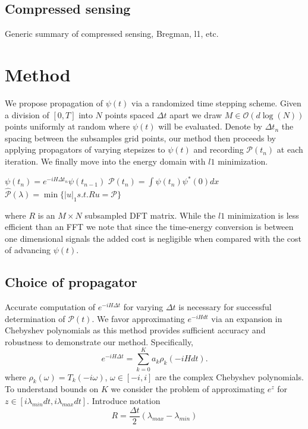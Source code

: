 \documentclass[12pt]{amsart}
\theoremstyle{remark}
\begin{document}
\subsection{Compressed sensing}

Generic summary of compressed sensing, Bregman, l1, etc.

\section{Method}

We propose propagation of $\psi(t)$ via a randomized time stepping scheme. Given a division of $[0,T]$ into $N$ points spaced $\Delta t$ apart we draw $M \in \mathcal{O}(d \log(N))$ points uniformly at random where $\psi(t)$ will be evaluated. Denote by $\Delta t_n$ the spacing between the subsamples grid points, our method then proceeds by applying propagators of varying stepsizes to $\psi(t)$ and recording $\mathcal{P}(t_n)$ at each iteration. We finally move into the energy domain with $l1$ minimization.

\begin{algorithmic}
\STATE $\psi(t_n) = e^{-iH\Delta t_n}\psi(t_{n-1})$
\STATE $\mathcal{P}(t_n) = \int \psi(t_n)\psi^*(0) dx$
\ENDFOR
\STATE $\hat{\mathcal{P}}(\lambda) = \min \{ |u|_1 s.t. Ru = \mathcal{P} \}$
\end{algorithmic}
where $R$ is an $M \times N$ subsampled DFT matrix. While the $l1$ minimization is less efficient than an FFT we note that since the time-energy conversion is between one dimensional signals the added cost is negligible when compared with the cost of advancing $\psi(t)$.

\subsection{Choice of propagator}
Accurate computation of $e^{-iH\Delta t}$ for varying $\Delta t$ is necessary for successful determination of $\mathcal{P}(t)$. We favor approximating $e^{-iHdt}$ via an expansion in Chebyshev polynomials \cite{Aviv1984} as this method provides sufficient accuracy and robustness to demonstrate our method. Specifically,
$$
e^{-iH\Delta t} = \sum_{k=0}^K a_k \rho_k (-iHdt).
$$
where $\rho_k(\omega) = T_k(-i\omega)$, $\omega \in [-i,i]$ are the complex Chebyshev polynomials. To understand bounds on $K$ we consider the problem of approximating $e^z$ for $z \in [i \lambda_{min} dt, i \lambda_{max} dt]$. Introduce notation
$$
R = \frac{\Delta t}{2}(\lambda_{max} - \lambda_{min})
$$
\end{document}
